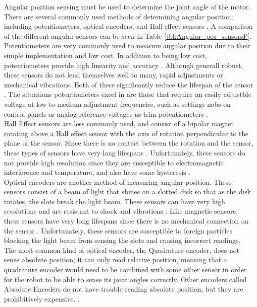 Angular position sensing must be used to determine the joint angle of the motor. There are several commonly used methods of determining angular position, including potentiometers, optical encoders, and Hall effect sensors \cite{Pot_vs_Sensor,Choose_Sensor_Technology,Choose_Position_Sensor}. A comparison of the different angular sensors can be seen in Table \ref{tbl:Angular_pos_sensorsP}. \\
\newline
Potentiometers are very commonly used to measure angular position due to their simple implementation and low cost. In addition to being low cost, potentiometers provide high linearity and accuracy \cite{Choose_Position_Sensor}. Although generall robust, these sensors do not lend themselves well to many, rapid adjustments or mechanical vibrations. Both of these significantly reduce the lifespan of the sensor \cite{Pot_vs_Sensor,Choose_Position_Sensor}. The situations potentiometers excel in are those that require an easily adjustble voltage at low to medium adjustment frequencies, such as settings nobs on control panels or analog reference voltages as trim potentiometers \cite{Pot_vs_Sensor}. \\
\newline
Hall Effect sensors are less commonly used, and consist of a bipolar magnet rotating above a Hall effect sensor with the axis of rotation perpendicular to the plane of the sensor. Since there is no contact between the rotation and the sensor, these types of sensors have very long lifespans \cite{Pot_vs_Sensor}. Unfortunately, these sensors do not provide high resolution since they are susceptible to electromagnetic interference and temperature, and also have some hysteresis \cite{Choose_Position_Sensor}. \\
\newline
Optical encoders are another method of measuring angular position. These sensors consist of a beam of light that shines on a slotted disk so that as the disk rotates, the slots break the light beam. These sensors can have very high resolutions and are resistant to shock and vibrations \cite{Choose_Sensor_Technology}. Like magnetic sensors, these sensors have very long lifespans since there is no mechanical connection on the sensor \cite{Pot_vs_Sensor}. Unfortunately, these sensors are susceptible to foreign particles blocking the light beam from sensing the slots and causing incorrect readings. The most common kind of optical encoder, the Quadrature encoder, does not sense absolute position; it can only read relative position, meaning that a quadrature encoder would need to be combined with some other sensor in order for the robot to be able to sense its joint angles correctly. Other encoders called Absolute Encoders do not have trouble reading absolute position, but they are prohibitively expensive. \cite{Choose_Position_Sensor}. 

